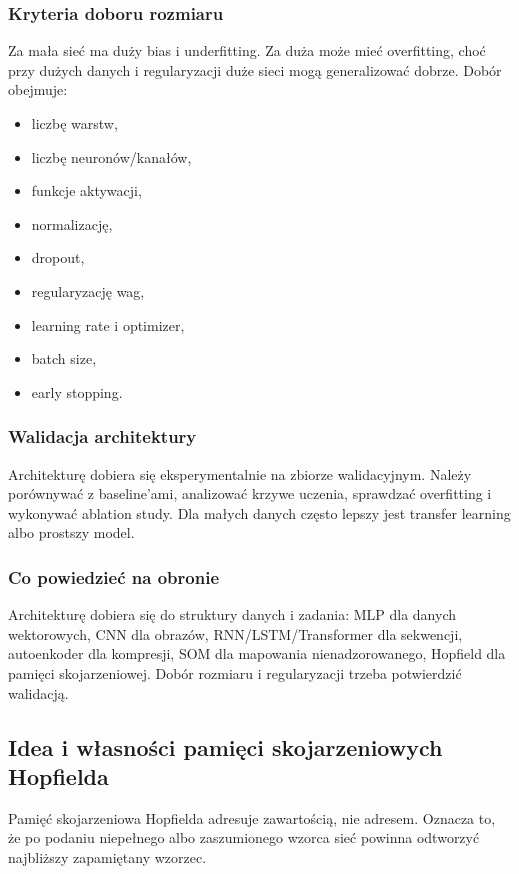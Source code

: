 \subsubsection{Kryteria doboru rozmiaru}

Za mała sieć ma duży bias i underfitting. Za duża może mieć overfitting, choć przy dużych danych i regularyzacji duże sieci mogą generalizować dobrze. Dobór obejmuje:
\begin{itemize}
  \item liczbę warstw,
  \item liczbę neuronów/kanałów,
  \item funkcje aktywacji,
  \item normalizację,
  \item dropout,
  \item regularyzację wag,
  \item learning rate i optimizer,
  \item batch size,
  \item early stopping.
\end{itemize}

\subsubsection{Walidacja architektury}

Architekturę dobiera się eksperymentalnie na zbiorze walidacyjnym. Należy porównywać z baseline'ami, analizować krzywe uczenia, sprawdzać overfitting i wykonywać ablation study. Dla małych danych często lepszy jest transfer learning albo prostszy model.

\subsubsection{Co powiedzieć na obronie}

Architekturę dobiera się do struktury danych i zadania: MLP dla danych wektorowych, CNN dla obrazów, RNN/LSTM/Transformer dla sekwencji, autoenkoder dla kompresji, SOM dla mapowania nienadzorowanego, Hopfield dla pamięci skojarzeniowej. Dobór rozmiaru i regularyzacji trzeba potwierdzić walidacją.

\subsection{Idea i własności pamięci skojarzeniowych Hopfielda}

Pamięć skojarzeniowa Hopfielda adresuje zawartością, nie adresem. Oznacza to, że po podaniu niepełnego albo zaszumionego wzorca sieć powinna odtworzyć najbliższy zapamiętany wzorzec.

